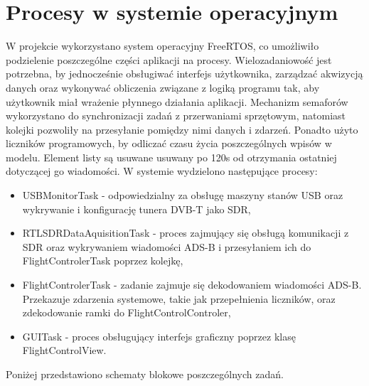 \documentclass[eng,printmode]{mgr}
\begin{document}
\section{Procesy w systemie operacyjnym}
W projekcie wykorzystano system operacyjny FreeRTOS, co umożliwiło podzielenie poszczególne części aplikacji na procesy. Wielozadaniowość jest potrzebna, by jednocześnie obsługiwać interfejs użytkownika, zarządzać akwizycją danych oraz wykonywać obliczenia związane z logiką programu tak, aby użytkownik miał wrażenie płynnego działania aplikacji. Mechanizm semaforów wykorzystano do synchronizacji zadań z przerwaniami sprzętowym, natomiast kolejki pozwoliły na przesyłanie pomiędzy nimi danych i zdarzeń. Ponadto użyto liczników programowych, by odliczać czasu życia poszczególnych wpisów w modelu. Element listy są usuwane usuwany po 120s od otrzymania ostatniej dotyczącej go wiadomości.
\newpage
\noindent
W systemie wydzielono następujące procesy:
\begin{itemize}
\item USBMonitorTask - odpowiedzialny za obsługę maszyny stanów USB oraz wykrywanie i konfigurację tunera DVB-T jako SDR, 
  
\item RTLSDRDataAquisitionTask - proces zajmujący się obsługą komunikacji z SDR oraz wykrywaniem wiadomości ADS-B i przesyłaniem ich do FlightControlerTask poprzez kolejkę,
    
\item FlightControlerTask - zadanie zajmuje się dekodowaniem wiadomości ADS-B. Przekazuje zdarzenia systemowe, takie jak przepełnienia liczników, oraz zdekodowanie ramki do FlightControlControler,

\item GUITask - proces obsługujący interfejs graficzny poprzez klasę FlightControlView.
\end{itemize}
\noindent
Poniżej przedstawiono schematy blokowe poszczególnych zadań.
\end{document}
